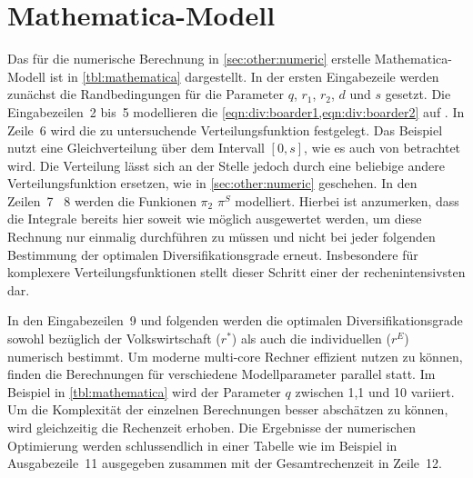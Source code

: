 
\chapter{Mathematica-Modell}%
\label{appendix:mathematica}

Das für die numerische Berechnung in \cref{sec:other:numeric} erstelle Mathematica-Modell ist in \cref{tbl:mathematica} dargestellt. In der ersten Eingabezeile werden zunächst die Randbedingungen für die Parameter $q$, $r_1$, $r_2$, $d$ und $s$ gesetzt. Die Eingabezeilen~2 bis~5 modellieren die \cref{eqn:div:boarder1,eqn:div:boarder2} auf . In Zeile~6 wird die zu untersuchende Verteilungsfunktion festgelegt. Das Beispiel nutzt eine Gleichverteilung über dem Intervall $[0,s]$, wie es auch von  betrachtet wird. Die Verteilung lässt sich an der Stelle jedoch durch eine beliebige andere Verteilungsfunktion ersetzen, wie in \cref{sec:other:numeric} geschehen. In den Zeilen~7 \bzw{}~8 werden die Funkionen $\pi_2$ \bzw{} $\pi^S$ modelliert. Hierbei ist anzumerken, dass die Integrale bereits hier soweit wie möglich ausgewertet werden, um diese Rechnung nur einmalig durchführen zu müssen und nicht bei jeder folgenden Bestimmung der optimalen Diversifikationsgrade erneut. Insbesondere für komplexere Verteilungsfunktionen stellt dieser Schritt einer der rechenintensivsten dar.

In den Eingabezeilen~9 und folgenden werden die optimalen Diversifikationsgrade sowohl bezüglich der Volkswirtschaft ($r^\ast$) als auch die individuellen ($r^E$) numerisch bestimmt. Um moderne multi-core Rechner effizient nutzen zu können, finden die Berechnungen für verschiedene Modellparameter parallel statt. Im Beispiel in \cref{tbl:mathematica} wird der Parameter $q$ zwischen 1,1 und 10 variiert. Um die Komplexität der einzelnen Berechnungen besser abschätzen zu können, wird gleichzeitig die Rechenzeit erhoben. Die Ergebnisse der numerischen Optimierung werden schlussendlich in einer Tabelle wie im Beispiel in Ausgabezeile~11 ausgegeben zusammen mit der Gesamtrechenzeit in Zeile~12.

